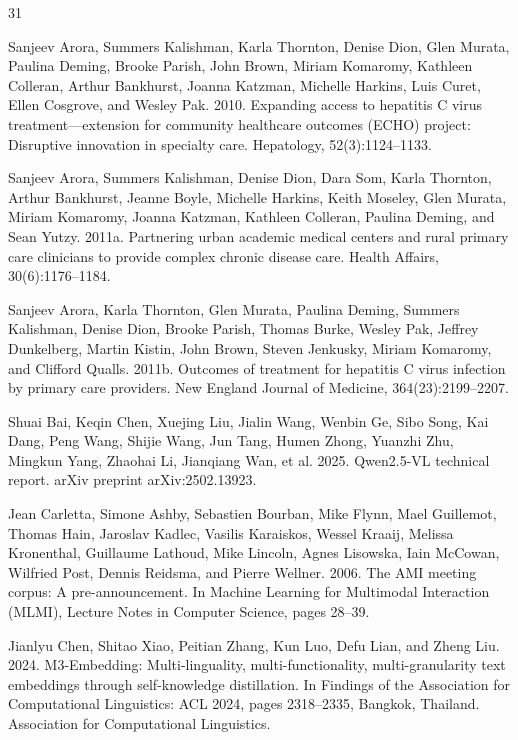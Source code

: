 \documentclass[11pt]{article}
\begin{document}
\clearpage
\begin{thebibliography}{31}

Sanjeev Arora, Summers Kalishman, Karla Thornton, Denise Dion, Glen Murata, Paulina Deming, Brooke Parish, John Brown, Miriam Komaromy, Kathleen Colleran, Arthur Bankhurst, Joanna Katzman, Michelle Harkins, Luis Curet, Ellen Cosgrove, and Wesley Pak. 2010. Expanding access to hepatitis C virus treatment---extension for community healthcare outcomes (ECHO) project: Disruptive innovation in specialty care. Hepatology, 52(3):1124--1133.

Sanjeev Arora, Summers Kalishman, Denise Dion, Dara Som, Karla Thornton, Arthur Bankhurst, Jeanne Boyle, Michelle Harkins, Keith Moseley, Glen Murata, Miriam Komaromy, Joanna Katzman, Kathleen Colleran, Paulina Deming, and Sean Yutzy. 2011a. Partnering urban academic medical centers and rural primary care clinicians to provide complex chronic disease care. Health Affairs, 30(6):1176--1184.

Sanjeev Arora, Karla Thornton, Glen Murata, Paulina Deming, Summers Kalishman, Denise Dion, Brooke Parish, Thomas Burke, Wesley Pak, Jeffrey Dunkelberg, Martin Kistin, John Brown, Steven Jenkusky, Miriam Komaromy, and Clifford Qualls. 2011b. Outcomes of treatment for hepatitis C virus infection by primary care providers. New England Journal of Medicine, 364(23):2199--2207.

Shuai Bai, Keqin Chen, Xuejing Liu, Jialin Wang, Wenbin Ge, Sibo Song, Kai Dang, Peng Wang, Shijie Wang, Jun Tang, Humen Zhong, Yuanzhi Zhu, Mingkun Yang, Zhaohai Li, Jianqiang Wan, et al. 2025. Qwen2.5-VL technical report. arXiv preprint arXiv:2502.13923.

Jean Carletta, Simone Ashby, Sebastien Bourban, Mike Flynn, Mael Guillemot, Thomas Hain, Jaroslav Kadlec, Vasilis Karaiskos, Wessel Kraaij, Melissa Kronenthal, Guillaume Lathoud, Mike Lincoln, Agnes Lisowska, Iain McCowan, Wilfried Post, Dennis Reidsma, and Pierre Wellner. 2006. The AMI meeting corpus: A pre-announcement. In Machine Learning for Multimodal Interaction (MLMI), Lecture Notes in Computer Science, pages 28--39.

Jianlyu Chen, Shitao Xiao, Peitian Zhang, Kun Luo, Defu Lian, and Zheng Liu. 2024. M3-Embedding: Multi-linguality, multi-functionality, multi-granularity text embeddings through self-knowledge distillation. In Findings of the Association for Computational Linguistics: ACL 2024, pages 2318--2335, Bangkok, Thailand. Association for Computational Linguistics.


\end{thebibliography}
\end{document}
